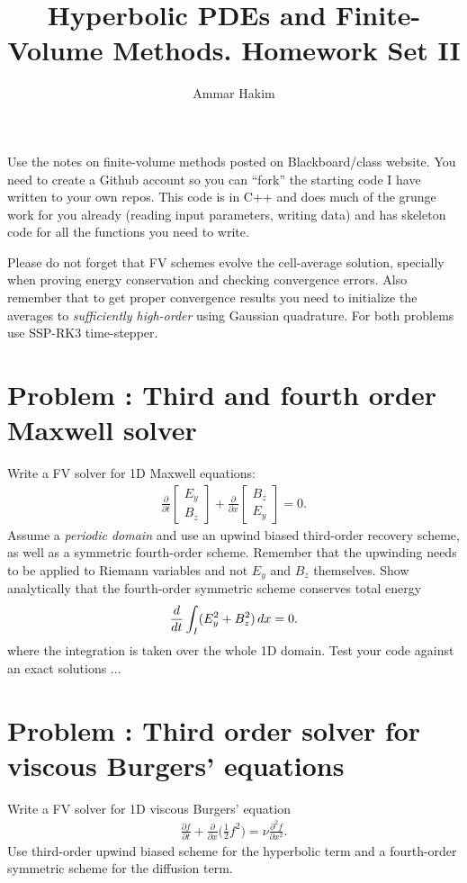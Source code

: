 \documentclass[11pt]{article}
\title{Hyperbolic PDEs and Finite-Volume Methods. Homework Set II}%
\author{Ammar Hakim}%
\date{}%
\newcommand{\pfrac}[2]{\frac{\partial #1}{\partial #2}}
\newcommand{\pfraca}[1]{\frac{\partial}{\partial #1}}
\newcounter{probnum}
\begin{document}
\maketitle

Use the notes on finite-volume methods posted on Blackboard/class
website. You need to create a Github account so you can ``fork'' the
starting code I have written to your own repos. This code is in C++
and does much of the grunge work for you already (reading input
parameters, writing data) and has skeleton code for all the functions
you need to write.

Please do not forget that FV schemes evolve the cell-average solution,
specially when proving energy conservation and checking convergence
errors. Also remember that to get proper convergence results you need
to initialize the averages to \emph{sufficiently high-order} using
Gaussian quadrature. For both problems use SSP-RK3 time-stepper.

\section*{Problem : Third and fourth order Maxwell solver}

Write a FV solver for 1D Maxwell equations:
\begin{align*}
  \frac{\partial }{\partial t}
  \left[
    \begin{matrix}
      E_y \\
      B_z
    \end{matrix}
  \right]
  +
  \frac{\partial }{\partial x}
  \left[
    \begin{matrix}
      B_z \\
      E_y
    \end{matrix}
  \right]
  =
  0.
\end{align*}
Assume a \emph{periodic domain} and use an upwind biased third-order
recovery scheme, as well as a symmetric fourth-order scheme. Remember
that the upwinding needs to be applied to Riemann variables and not
$E_y$ and $B_z$ themselves. Show analytically that the fourth-order
symmetric scheme conserves total energy
\begin{align}
  \frac{d}{dt} \int_I (E_y^2 + B_z^2) \thinspace dx = 0.
\end{align}
where the integration is taken over the whole 1D domain. Test your
code against an exact solutions ...

\section*{Problem : Third order solver for viscous
  Burgers' equations}

Write a FV solver for 1D viscous Burgers' equation
\begin{align}
  \pfrac{f}{t} + \pfraca{x} \bigg( \frac{1}{2} f^2 \bigg)
  = \nu \frac{\partial^2 f}{\partial x^2}.
\end{align}
Use third-order upwind biased scheme for the hyperbolic term and a
fourth-order symmetric scheme for the diffusion term.
\end{document}
